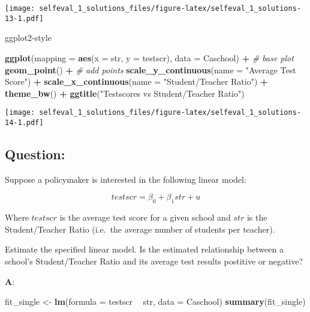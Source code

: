 \documentclass[12pt,]{article}
\newenvironment{Shaded}{\begin{snugshade}}{\end{snugshade}}
\newcommand{\CommentTok}[1]{\textcolor[rgb]{0.56,0.35,0.01}{\textit{#1}}}
\newcommand{\DataTypeTok}[1]{\textcolor[rgb]{0.13,0.29,0.53}{#1}}
\newcommand{\KeywordTok}[1]{\textcolor[rgb]{0.13,0.29,0.53}{\textbf{#1}}}
\newcommand{\NormalTok}[1]{#1}
\newcommand{\OperatorTok}[1]{\textcolor[rgb]{0.81,0.36,0.00}{\textbf{#1}}}
\newcommand{\StringTok}[1]{\textcolor[rgb]{0.31,0.60,0.02}{#1}}
\begin{document}
\texttt{[image: selfeval\_1\_solutions\_files/figure-latex/selfeval\_1\_solutions-13-1.pdf]}

ggplot2-style

\begin{Shaded}
\begin{Highlighting}[]
\KeywordTok{ggplot}\NormalTok{(}\DataTypeTok{mapping =} \KeywordTok{aes}\NormalTok{(}\DataTypeTok{x =}\NormalTok{ str, }\DataTypeTok{y =}\NormalTok{ testscr), }\DataTypeTok{data =}\NormalTok{ Caschool) }\OperatorTok{+}\StringTok{ }\CommentTok{# base plot}
\StringTok{  }\KeywordTok{geom_point}\NormalTok{() }\OperatorTok{+}\StringTok{ }\CommentTok{# add points}
\StringTok{  }\KeywordTok{scale_y_continuous}\NormalTok{(}\DataTypeTok{name =} \StringTok{"Average Test Score"}\NormalTok{) }\OperatorTok{+}\StringTok{ }
\StringTok{  }\KeywordTok{scale_x_continuous}\NormalTok{(}\DataTypeTok{name =} \StringTok{"Student/Teacher Ratio"}\NormalTok{) }\OperatorTok{+}
\StringTok{  }\KeywordTok{theme_bw}\NormalTok{() }\OperatorTok{+}\StringTok{ }\KeywordTok{ggtitle}\NormalTok{(}\StringTok{"Testscores vs Student/Teacher Ratio"}\NormalTok{)}
\end{Highlighting}
\end{Shaded}

\texttt{[image: selfeval\_1\_solutions\_files/figure-latex/selfeval\_1\_solutions-14-1.pdf]}

\hypertarget{question-9}{%
\subsection{Question:}\label{question-9}}

Suppose a policymaker is interested in the following linear model:

\begin{equation}
testscr = \beta_0 +  \beta_1  str + u
\end{equation}

Where \(testscr\) is the average test score for a given school and
\(str\) is the Student/Teacher Ratio (i.e.~the average number of
students per teacher).

Estimate the specified linear model. Is the estimated relationship
between a school's Student/Teacher Ratio and its average test results
postitive or negative?

\textbf{A}:

\begin{Shaded}
\begin{Highlighting}[]
\NormalTok{fit_single <-}\StringTok{ }\KeywordTok{lm}\NormalTok{(}\DataTypeTok{formula =}\NormalTok{ testscr }\OperatorTok{~}\StringTok{ }\NormalTok{str, }\DataTypeTok{data =}\NormalTok{ Caschool)}
\KeywordTok{summary}\NormalTok{(fit_single)}
\end{Highlighting}
\end{Shaded}
\end{document}
